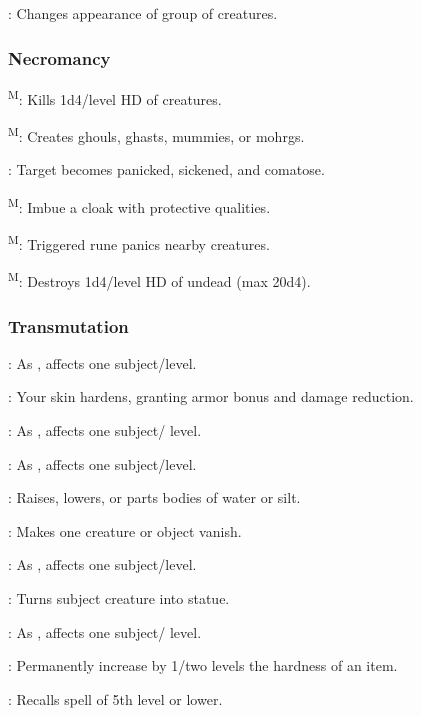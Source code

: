	: Changes appearance of group of creatures.

\subsubsection{Necromancy}
	\textsuperscript{M}: Kills 1d4/level HD of creatures.

	\textsuperscript{M}: Creates ghouls, ghasts, mummies, or mohrgs.

	: Target becomes panicked, sickened, and comatose.

	\textsuperscript{M}: Imbue a cloak with protective qualities. %

	\textsuperscript{M}: Triggered rune panics nearby creatures.

	\textsuperscript{M}: Destroys 1d4/level HD of undead (max 20d4).

\subsubsection{Transmutation}

	: As , affects one subject/level.

	: Your skin hardens, granting armor bonus and damage reduction. %

	: As , affects one subject/ level.

	: As , affects one subject/level.

	: Raises, lowers, or parts bodies of water or silt. %

	: Makes one creature or object vanish.

	: As , affects one subject/level.

	: Turns subject creature into statue.

	: As , affects one subject/ level.

	: Permanently increase by 1/two levels the hardness of an item.

	: Recalls spell of 5th level or lower.

